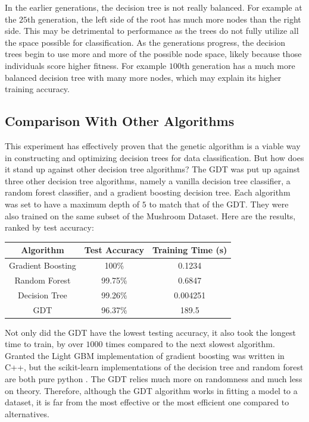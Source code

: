 \documentclass[12pt]{article}
\begin{document}
In the earlier generations, the decision tree is not really balanced. For example at the $25$th generation, the left side of the root has much more nodes than the right side. This may be detrimental to performance as the trees do not fully utilize all the space possible for classification. As the generations progress, the decision trees begin to use more and more of the possible node space, likely because those individuals score higher fitness. For example $100$th generation has a much more balanced decision tree with many more nodes, which may explain its higher training accuracy.

\subsection{Comparison With Other Algorithms}

This experiment has effectively proven that the genetic algorithm is a viable way in constructing and optimizing decision trees for data classification. But how does it stand up against other decision tree algorithms? The GDT was put up against three other decision tree algorithms, namely a vanilla decision tree classifier, a random forest classifier, and a gradient boosting decision tree. Each algorithm was set to have a maximum depth of $5$ to match that of the GDT. They were also trained on the same subset of the Mushroom Dataset. Here are the results, ranked by test accuracy:

\begin{center}
    \begin{tabular}{|c|c|c|}
        \hline
        Algorithm & Test Accuracy & Training Time (s) \\
        \hline \hline
        Gradient Boosting & 100\% & 0.1234 \\
        \hline
        Random Forest & 99.75\% & 0.6847 \\
        \hline
        Decision Tree & 99.26\% & 0.004251 \\
        \hline
        GDT & 96.37\% & 189.5 \\
        \hline
    \end{tabular}
\end{center}

Not only did the GDT have the lowest testing accuracy, it also took the longest time to train, by over $1000$ times compared to the next slowest algorithm. Granted the Light GBM \cite{ke2017lightgbm} implementation of gradient boosting was written in C++, but the scikit-learn implementations of the decision tree and random forest are both pure python \cite{scikit-learn}. The GDT relies much more on randomness and much less on theory. Therefore, although the GDT algorithm works in fitting a model to a dataset, it is far from the most effective or the most efficient one compared to alternatives.
\end{document}
